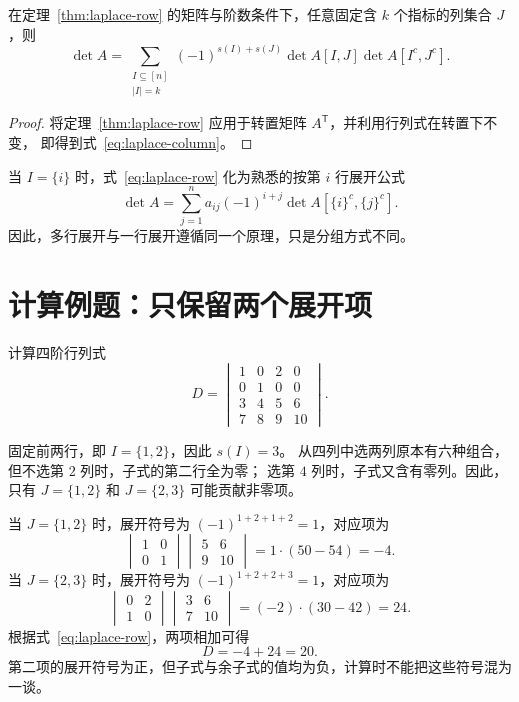 \documentclass[UTF8,12pt,a4paper,fontset=fandol]{ctexart}
\begin{document}
\begin{corollary}[按固定的多列展开]
在定理~\ref{thm:laplace-row} 的矩阵与阶数条件下，任意固定含 $k$ 个指标的列集合 $J$，则
\begin{equation}
  \det A=\sum_{\substack{I\subseteq[n]\\|I|=k}}
  (-1)^{s(I)+s(J)}\det A[I,J]\det A[I^c,J^c].
  \label{eq:laplace-column}
\end{equation}
\end{corollary}

\begin{proof}
将定理~\ref{thm:laplace-row} 应用于转置矩阵 $A^{\mathsf T}$，并利用行列式在转置下不变，
即得到式~\eqref{eq:laplace-column}。
\end{proof}

当 $I=\{i\}$ 时，式~\eqref{eq:laplace-row} 化为熟悉的按第 $i$ 行展开公式
\[
  \det A=\sum_{j=1}^n a_{ij}(-1)^{i+j}
  \det A[\{i\}^c,\{j\}^c].
\]
因此，多行展开与一行展开遵循同一个原理，只是分组方式不同。

\section{计算例题：只保留两个展开项}

\begin{example}
\label{ex:laplace-two-terms}
计算四阶行列式
\[
  D=\begin{vmatrix}
    1&0&2&0\\
    0&1&0&0\\
    3&4&5&6\\
    7&8&9&10
  \end{vmatrix}.
\]
\end{example}

\begin{solve}
固定前两行，即 $I=\{1,2\}$，因此 $s(I)=3$。
从四列中选两列原本有六种组合，但不选第 $2$ 列时，子式的第二行全为零；
选第 $4$ 列时，子式又含有零列。因此，只有 $J=\{1,2\}$ 和 $J=\{2,3\}$ 可能贡献非零项。

当 $J=\{1,2\}$ 时，展开符号为 $(-1)^{1+2+1+2}=1$，对应项为
\[
  \begin{vmatrix}1&0\\0&1\end{vmatrix}
  \begin{vmatrix}5&6\\9&10\end{vmatrix}
  =1\cdot(50-54)=-4.
\]
当 $J=\{2,3\}$ 时，展开符号为 $(-1)^{1+2+2+3}=1$，对应项为
\[
  \begin{vmatrix}0&2\\1&0\end{vmatrix}
  \begin{vmatrix}3&6\\7&10\end{vmatrix}
  =(-2)\cdot(30-42)=24.
\]
根据式~\eqref{eq:laplace-row}，两项相加可得
\[
  D=-4+24=20.
\]
第二项的展开符号为正，但子式与余子式的值均为负，计算时不能把这些符号混为一谈。
\end{solve}
\end{document}
